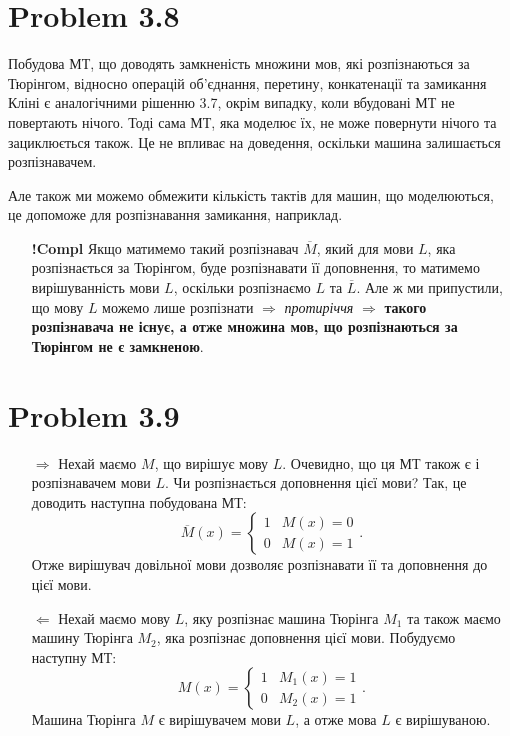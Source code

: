 \documentclass[12pt,letterpaper]{article}
\begin{document}
\section{Problem 3.8}
Побудова МТ, що доводять замкненість множини мов, які розпізнаються за Тюрінгом, відносно операцій об'єднання, перетину, конкатенації та замикання Кліні є аналогічними рішенню 3.7, окрім випадку, коли вбудовані МТ не повертають нічого. Тоді сама МТ, яка моделює їх, не може повернути нічого та зациклюється також. Це не впливає на доведення, оскільки машина залишається розпізнавачем.

Але також ми можемо обмежити кількість тактів для машин, що моделюються, це допоможе для розпізнавання замикання, наприклад.

\begin{itemize}
    \item[\textbf{!Compl}] Якщо матимемо такий розпізнавач $\overline M$, який для мови $L$, яка розпізнається за Тюрінгом, буде розпізнавати її доповнення, то матимемо вирішуванність мови $L$, оскільки розпізнаємо $L$ та $\overline L$. Але ж ми припустили, що мову $L$ можемо лише розпізнати $\Rightarrow $ \textit{протиріччя} $\Rightarrow$ \textbf{такого розпізнавача не існує, а отже множина мов, що розпізнаються за Тюрінгом не є замкненою}.
\end{itemize}
\section{Problem 3.9}

\begin{itemize}
    \item[$\Rightarrow$] Нехай маємо $M$, що вирішує мову $L$. Очевидно, що ця МТ також є і розпізнавачем мови $L$. Чи розпізнається доповнення цієї мови? Так, це доводить наступна побудована МТ:
        \[
            \overline M(x) = \begin{cases}
                1 & M(x) = 0 \\
                0 & M(x) = 1
            \end{cases}
        .\] 
        Отже вирішувач довільної мови дозволяє розпізнавати її та доповнення до цієї мови.
    \item[$\Leftarrow$] Нехай маємо мову $L$, яку розпізнає машина Тюрінга $M_1$ та також маємо машину Тюрінга $M_2$, яка розпізнає доповнення цієї мови. Побудуємо наступну МТ:
        \[
            M(x) = \begin{cases}
                1 & M_1(x) = 1 \\
                0 & M_2(x) = 1
            \end{cases}
        .\] 
        Машина Тюрінга $M$ є вирішувачем мови $L$, а отже мова $L$ є вирішуваною.
\end{itemize}
\end{document}
